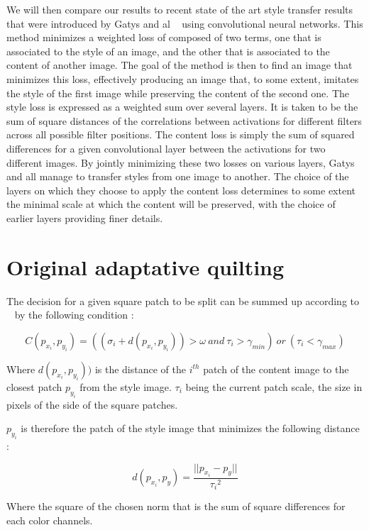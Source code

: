 \documentclass[a4paper]{article}
\begin{document}
We will then compare our results to recent state of the art style transfer results that were introduced by Gatys and al ~\cite{neuralstyle} using convolutional neural networks. This method minimizes a weighted loss of composed of two terms, one that is associated to the style of an image, and the other that is associated to the content of another image. The goal of the method is then to find an image that minimizes this loss, effectively producing an image that, to some extent, imitates the style of the first image while preserving the content of the second one.
The style loss is expressed as a weighted sum over several layers. It is taken to be the sum of square distances of the correlations between activations for different filters across all possible filter positions. The content loss is simply the sum of squared differences for a given convolutional layer between the activations for two different images. 
By jointly minimizing these two losses on various layers, Gatys and all manage to transfer styles from one image to another. The choice of the layers on which they choose to apply the content loss determines to some extent the minimal scale at which the content will be preserved, with the choice of earlier layers providing finer details.



\section{Original adaptative quilting}

The decision for a given square patch to be split can be summed up according to ~\cite{adaptative-quilting}  by the following condition :

\[ C(p_{x_i}, p_{y_i}) = ((\sigma_i + d(p_{x_i}, p_{y_i})) > \omega \  and  \ \tau_i  > \gamma_{min}) \ or \ (\tau_i < \gamma_{max}) \] 


Where ${d(p_{x_i}, p_{y_i}))}$ is the distance of the ${i^{th}}$ patch of the content image to the closest patch ${p_{y_i}}$ from the style image. ${\tau_i}$ being the current patch scale, the size in pixels of the side of the square patches.

${p_{y_i}}$ is therefore the patch of the style image that minimizes the following distance :

\[d(p_{x_i}, p_{y}) = \frac{||p_{x_i}-p_y||}{{\tau_i}^2}\] 

Where the square of the chosen norm that is the sum of square differences for each color channels. 
\end{document}
